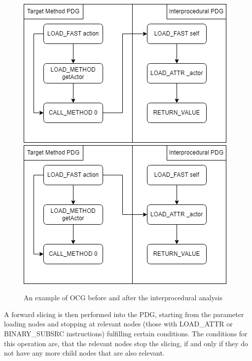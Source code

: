 \documentclass[%
  chapterprefix=false,%
  open=right,%
  twoside=true,%
  paper=a4,%
  logofile={Figures/logo.png},%
  thesistype=master,%
  UKenglish,%
]{se2thesis}
\begin{document}
\begin{figure}[htb]
    \includegraphics[width=\linewidth]{Figures/before_analysis.png}
  \endminipage\hfill
    \includegraphics[width=\linewidth]{Figures/after_analysis.png}
  \endminipage\hfill
\caption{An example of OCG before and after the interprocedural analysis}\label{fig:inter_analysis}
\end{figure}

A forward slicing is then performed into the PDG, starting from the parameter loading nodes and stopping at relevant nodes (those with LOAD\_ATTR or BINARY\_SUBSRC instructions) fulfilling certain conditions.
The conditions for this operation are, that the relevant nodes stop the slicing, if and only if they do not have any more child nodes that are also relevant.
\end{document}
